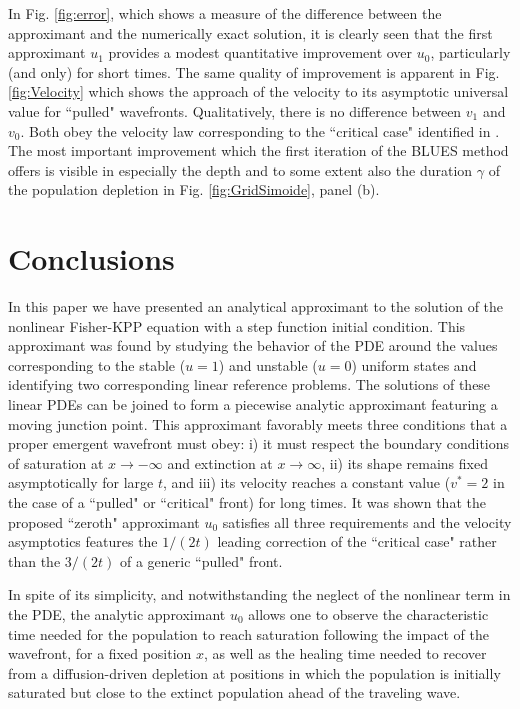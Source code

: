 \documentclass[amsmath,amssymb,amsfonts,aps,pre,preprint,superscriptaddress,showpacs,showkeys,longbibliography,nofootinbib]{revtex4-1}
\begin{document}
In Fig. \ref{fig:error}, which shows a measure of the difference between the approximant and the numerically exact solution, it is clearly seen that the first approximant $u_1$ provides a modest quantitative improvement over $u_0$, particularly (and only) for short times. The same quality of improvement is apparent in Fig. \ref{fig:Velocity} which shows the approach of the velocity to its asymptotic universal value for ``pulled" wavefronts. Qualitatively, there is no difference between $v_1$ and $v_0$. Both obey the velocity law corresponding to the ``critical case" identified in \cite{Berestycki2017}. The most important improvement which the first iteration of the BLUES method offers is visible in especially the depth and to some extent also the duration $\gamma$ of the population depletion in Fig. \ref{fig:GridSimoide}, panel (b). 

\section{Conclusions}\label{sec:conclusion}
In this paper we have presented an analytical approximant to the solution of the nonlinear Fisher-KPP equation with a step function initial condition. This approximant was found by studying the behavior of the PDE around the values corresponding to the stable ($u=1$) and unstable ($u=0$) uniform states and identifying two corresponding linear reference problems. The solutions of these linear PDEs can be joined to form a piecewise analytic approximant featuring a moving junction point. This approximant favorably meets three conditions that a proper emergent wavefront must obey: i) it must respect the boundary conditions of saturation at $x \to -\infty$ and extinction at $x \to \infty$, ii) its shape remains fixed asymptotically for large $t$, and iii) its velocity reaches a constant value ($v^* = 2$ in the case of a ``pulled" or ``critical" front) for long times. It was shown that the proposed ``zeroth" approximant $u_0$ satisfies all three requirements and the velocity asymptotics features the $1/(2t)$ leading correction of the ``critical case" rather than the $3/(2t)$ of a generic ``pulled" front. 

In spite of its simplicity, and notwithstanding the neglect of the nonlinear term in the PDE, the analytic approximant $u_0$ allows one to observe the characteristic time needed for the population to reach saturation following the impact of the wavefront, for a fixed position $x$, as well as the healing time needed to recover from a diffusion-driven depletion at positions in which the population is initially saturated but close to the extinct population ahead of the traveling wave. 
\end{document}
